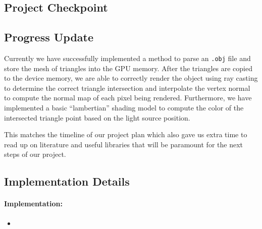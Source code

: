 \documentclass[12pt]{article}
\begin{document}
\begin{center}
    \section*{Project Checkpoint}
\end{center}


\subsection*{Progress Update}

Currently we have successfully implemented a method to parse an \texttt{.obj} file and store the
mesh of triangles into the GPU memory. After the triangles are copied to the device memory, we are
able to correctly render the object using ray casting to determine the correct triangle 
intersection and interpolate the vertex normal to compute the normal map of each pixel being
rendered. Furthermore, we have implemented a basic ``lambertian'' shading model to
compute the color of the intersected triangle point based on the light source position.

This matches the timeline of our project plan which also gave us extra time to read up on
literature and useful libraries that will be paramount for the next steps of our project.

\subsection*{Implementation Details}

\paragraph{Implementation:}

\begin{itemize}
    \item 
\end{itemize}
\end{document}
